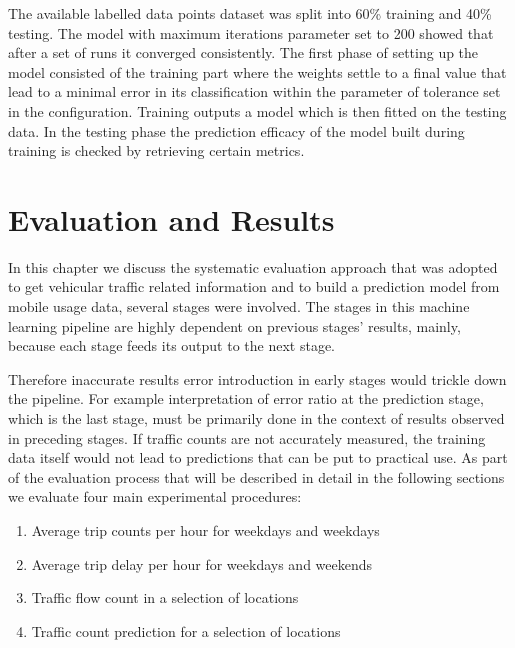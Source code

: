\documentclass[12pt, a4paper]{report}
\theoremstyle{definition}
\theoremstyle{definition}%
\theoremstyle{definition}%
\theoremstyle{definition}%
\theoremstyle{definition}%
\theoremstyle{definition}%
\begin{document}
The available labelled data points dataset was split into 60\% training and 40\% testing. The model with maximum iterations parameter set to 200 showed that after a set of runs it converged consistently. The first phase of setting up the model consisted of the training part where the weights settle to a final value that lead to a minimal error in its classification within the parameter of tolerance set in the configuration. Training outputs a model which is then fitted on the testing data. In the testing phase the prediction efficacy of the model built during training is checked by retrieving certain metrics.



\chapter{Evaluation and Results} \label{chapter:evaluation_and_results}

In this chapter we discuss the systematic evaluation approach that was adopted to get vehicular traffic related information and to build a prediction model from mobile usage data, several stages were involved. The stages in this machine learning pipeline are highly dependent on previous stages' results, mainly, because each stage feeds its output to the next stage. 

Therefore inaccurate results error introduction in early stages would trickle down the pipeline. For example interpretation of error ratio at the prediction stage, which is the last stage, must be primarily  done in the context of results observed in preceding stages. If traffic counts are not accurately measured, the training data itself would not lead to predictions that can be put to practical use. As part of the evaluation process that will be described in detail in the following sections we evaluate four main experimental procedures:

\begin{enumerate}
	\item Average trip counts per hour for weekdays and weekdays
	\item Average trip delay per hour for weekdays and weekends
	\item Traffic flow count in a selection of locations
	\item Traffic count prediction for a selection of locations
\end{enumerate}

\end{document}
